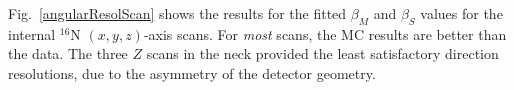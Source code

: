 Fig.~\ref{angularResolScan} shows the results for the fitted $\beta_M$ and $\beta_S$ values for the internal $^{16}$N $(x,y,z)$-axis scans. For {\em most} scans, the MC results are better than the data. The three $Z$ scans in the neck provided the least satisfactory direction resolutions, due to the asymmetry of the detector geometry.

\begin{figure}
	\centering

\end{figure}
